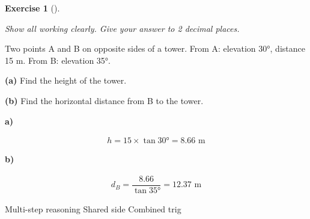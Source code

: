 \documentclass[
  letterpaper,
  DIV=11,
  numbers=noendperiod]{scrreprt}
\theoremstyle{definition}
\newtheorem{exercise}{Exercise}[chapter]
\theoremstyle{remark}
\begin{document}
\begin{exercise}[]\protect\hypertarget{exr-trig-22}{}\label{exr-trig-22}

\emph{Show all working clearly. Give your answer to 2 decimal places.}

Two points A and B on opposite sides of a tower. From A: elevation 30°,
distance 15 m. From B: elevation 35°.

\textbf{(a)} Find the height of the tower.

\textbf{(b)} Find the horizontal distance from B to the tower.

\begin{tcolorbox}[enhanced jigsaw, opacitybacktitle=0.6, coltitle=black, arc=.35mm, colframe=quarto-callout-tip-color-frame, colback=white, bottomrule=.15mm, left=2mm, colbacktitle=quarto-callout-tip-color!10!white, titlerule=0mm, opacityback=0, title=\textcolor{quarto-callout-tip-color}{\faLightbulb}\hspace{0.5em}{🔍 View Solution}, leftrule=.75mm, breakable, rightrule=.15mm, bottomtitle=1mm, toptitle=1mm, toprule=.15mm]

\textbf{a)}

\[
\begin{aligned}
h = 15 \times \tan 30° = 8.66 \text{ m}
\end{aligned}
\]

\textbf{b)}

\[
\begin{aligned}
d_B = \dfrac{8.66}{\tan 35°} = 12.37 \text{ m}
\end{aligned}
\]

\end{tcolorbox}

{Multi-step reasoning} {Shared side} {Combined trig}

\end{exercise}
\end{document}
